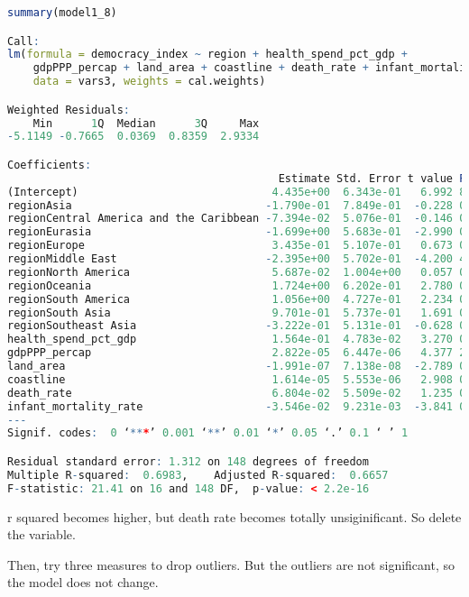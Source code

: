 \begin{lstlisting}[language=R, caption=Result of the model]
summary(model1_8)

Call:
lm(formula = democracy_index ~ region + health_spend_pct_gdp + 
    gdpPPP_percap + land_area + coastline + death_rate + infant_mortality_rate, 
    data = vars3, weights = cal.weights)

Weighted Residuals:
    Min      1Q  Median      3Q     Max 
-5.1149 -0.7665  0.0369  0.8359  2.9334 

Coefficients:
                                          Estimate Std. Error t value Pr(>|t|)    
(Intercept)                              4.435e+00  6.343e-01   6.992 8.66e-11 ***
regionAsia                              -1.790e-01  7.849e-01  -0.228 0.819917    
regionCentral America and the Caribbean -7.394e-02  5.076e-01  -0.146 0.884375    
regionEurasia                           -1.699e+00  5.683e-01  -2.990 0.003272 ** 
regionEurope                             3.435e-01  5.107e-01   0.673 0.502226    
regionMiddle East                       -2.395e+00  5.702e-01  -4.200 4.59e-05 ***
regionNorth America                      5.687e-02  1.004e+00   0.057 0.954903    
regionOceania                            1.724e+00  6.202e-01   2.780 0.006142 ** 
regionSouth America                      1.056e+00  4.727e-01   2.234 0.026960 *  
regionSouth Asia                         9.701e-01  5.737e-01   1.691 0.092975 .  
regionSoutheast Asia                    -3.222e-01  5.131e-01  -0.628 0.531052    
health_spend_pct_gdp                     1.564e-01  4.783e-02   3.270 0.001339 ** 
gdpPPP_percap                            2.822e-05  6.447e-06   4.377 2.26e-05 ***
land_area                               -1.991e-07  7.138e-08  -2.789 0.005976 ** 
coastline                                1.614e-05  5.553e-06   2.908 0.004203 ** 
death_rate                               6.804e-02  5.509e-02   1.235 0.218762    
infant_mortality_rate                   -3.546e-02  9.231e-03  -3.841 0.000181 ***
---
Signif. codes:  0 ‘***’ 0.001 ‘**’ 0.01 ‘*’ 0.05 ‘.’ 0.1 ‘ ’ 1

Residual standard error: 1.312 on 148 degrees of freedom
Multiple R-squared:  0.6983,	Adjusted R-squared:  0.6657 
F-statistic: 21.41 on 16 and 148 DF,  p-value: < 2.2e-16
\end{lstlisting}

r squared becomes higher, but death rate becomes totally unsiginificant. So delete the variable.

Then, try three measures to drop outliers. But the outliers are not significant, so the model does not change.


